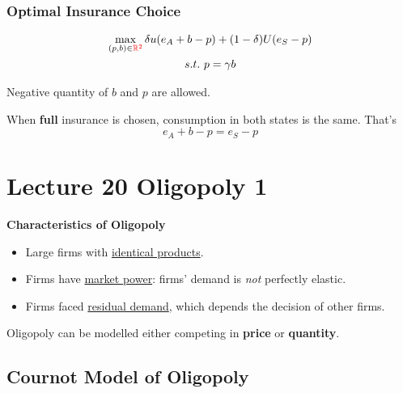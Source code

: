 \documentclass[]{article}
\begin{document}
            \subsubsection{Optimal Insurance Choice}
                \begin{gather*}
                    \max_{(p, b) \in \textcolor{red}{\mathbb{R}^2}} \delta u(e_A + b - p) + (1 - \delta) U(e_S - p) \\
                    s.t.\ p = \gamma b
                \end{gather*}
                \begin{remark}
                    Negative quantity of $b$ and $p$ are allowed.
                \end{remark}
                
                \begin{definition}
                    When \textbf{full} insurance is chosen, consumption in both states is the same. That's 
                    \[
                        e_A + b - p = e_S - p
                    \]
                \end{definition}
            
    \section{Lecture 20 Oligopoly 1}
        \begin{remark}
            \textbf{Characteristics of Oligopoly}
            \begin{itemize}
                \item Large firms with \ul{identical products}.
                \item Firms have \ul{market power}: firms' demand is \emph{not} perfectly elastic.
                \item Firms faced \ul{residual demand}, which depends the decision of other firms.
            \end{itemize}
        \end{remark}
        
        \begin{remark}
            Oligopoly can be modelled either competing in \textbf{price} or \textbf{quantity}.
        \end{remark}
        
        \subsection{Cournot Model of Oligopoly}
\end{document}
